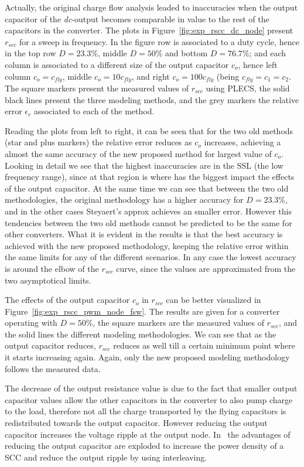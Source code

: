 Actually, the original charge flow analysis leaded to inaccuracies when the output capacitor of the \emph{dc}-output becomes comparable in value to the rest of the capacitors in the converter. The plots in Figure~\ref{fig:exp_rscc_dc_node} present $r_{scc}$ for a sweep in frequency. In the figure row is associated to a duty cycle, hence in the top row $D=23.3\%$, middle $D=50\%$ and bottom $D=76.7\%$; and each column is associated to a different size of the output capacitor $c_o$, hence left column $c_o=c_{fly}$, middle $c_o=10c_{fly}$, and right $c_o=100c_{fly}$ (being $c_{fly}=c_1=c_2$. The square markers present the measured values of $r_{scc}$ using PLECS, the solid black lines present the three modeling methods, and the grey markers the relative error $\epsilon_r$ associated to each of the method.

Reading the plots from left to right, it can be seen that for the two old methods (star and plus markers) the relative error reduces as $c_o$ increases, achieving a almost the same accuracy of the new proposed method for largest value of $c_o$. Looking in detail we see that the highest inaccuracies are in the SSL (the low frequency range), since at that region is where has the biggest impact the effects of the output capacitor. At the same time we can see that between the two old methodologies, the original methodology has a higher accuracy for $D=23.3\%$, and in the other cases Steyaert's approx achieves an smaller error. However this tendencies between the two old methods cannot be predicted to be the same for other converters. What it is evident in the results is that the best accuracy is achieved with the new proposed methodology, keeping the relative error within the same limits for any of the different scenarios. In any case the lowest accuracy is around the elbow of the $r_{scc}$ curve, since the values are approximated from the two asymptotical limits.

The effects of the output capacitor $c_o$ in $r_{scc}$ can be better visualized in Figure~\ref{fig:exp_rscc_pwm_node_fsw}. The results are given for a converter operating with $D=50\%$, the square markers are the measured values of $r_{scc}$, and the solid lines the different modeling methodologies. We can see that as the output capacitor reduces, $r_{scc}$ reduces as well till a certain minimum point where it starts increasing again. Again, only the new proposed modeling methodology follows the measured data.

The decrease of the output resistance value is due to the fact that smaller output capacitor values allow the other capacitors in the converter to also pump charge to the load, therefore not all the charge transported by the flying capacitors is redistributed towards the output capacitor. However reducing the output capacitor increases the voltage ripple at the output node. In~\cite{14Andersen} the advantages of reducing the output capacitor are exploded to increase the power density of a SCC and reduce the output ripple by using interleaving.

